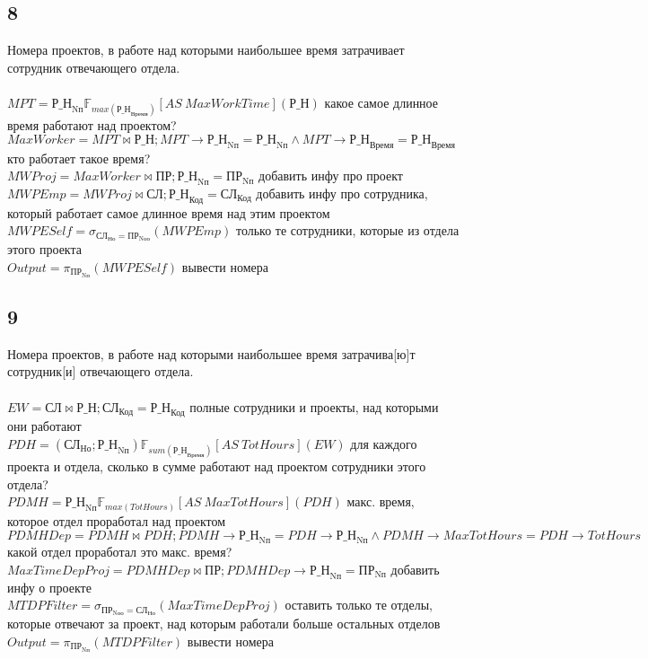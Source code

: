 \documentclass[12pt]{article}
\newcommand{\employee}{\textbf{СЛ}}
\newcommand{\project}{\textbf{ПР}}
\newcommand{\workson}{\textbf{Р\_Н}}
\newcommand{\employeeId}{\textbf{СЛ}_\text{Код}}
\newcommand{\employeeDepId}{\textbf{СЛ}_\text{Но}}
\newcommand{\projectId}{\textbf{ПР}_\text{Nп}}
\newcommand{\projectResponsibleDepId}{\textbf{ПР}_\text{Nоо}}
\newcommand{\worksonEmpId}{\textbf{Р\_Н}_\text{Код}}
\newcommand{\worksonProjId}{\textbf{Р\_Н}_\text{Nп}}
\newcommand{\worksonTime}{\textbf{Р\_Н}_\text{Время}}
\newcommand{\filter}[2]{\sigma{}_{#1} \allowbreak \left( #2 \right)}
\newcommand{\join}[3]{ #1 \bowtie #2;\allowbreak #3 }
\newcommand{\select}[2]{\pi_{#1} \allowbreak \left( #2 \right)}
\newcommand{\aggregate}[4]{  #1 \mathbb{F}_{#2} \left[AS\ #3 \right] \left( #4 \right)  }
\begin{document}
\subsection{8}
Номера проектов, в работе над которыми наибольшее время затрачивает сотрудник отвечающего отдела.\\\\
    $ MPT = \aggregate{\worksonProjId}{max(\worksonTime)}{MaxWorkTime}{\workson}$ 
 какое самое длинное время работают над проектом? \\ 
    $ MaxWorker = \join{MPT}{\workson}{MPT\rightarrow\worksonProjId = \worksonProjId \wedge  MPT\rightarrow\worksonTime = \worksonTime}$ 
 кто работает такое время? \\ 
    $ MWProj = \join{MaxWorker}{\project}{\worksonProjId = \projectId}$ 
 добавить инфу про проект \\ 
    $ MWPEmp = \join{MWProj}{\employee}{\worksonEmpId = \employeeId}$ 
 добавить инфу про сотрудника, который работает самое длинное время над этим проектом \\  
    $ MWPESelf = \filter{\employeeDepId = \projectResponsibleDepId}{MWPEmp}$ 
 только те сотрудники, которые из отдела этого проекта \\ 
    $ Output = \select{\projectId}{MWPESelf}$ 
 вывести номера \\ 

\subsection{9}
Номера проектов, в работе над которыми наибольшее время затрачива[ю]т сотрудник[и] отвечающего отдела.\\\\
    $ EW = \join{\employee}{\workson}{\employeeId = \worksonEmpId}$ 
 полные сотрудники и проекты, над которыми они работают \\ 
    $ PDH = \aggregate{\left(\employeeDepId; \worksonProjId\right)}{sum(\worksonTime)}{TotHours}{EW}$ 
 для каждого проекта и отдела, сколько в сумме работают над проектом сотрудники этого отдела? \\ 
    $ PDMH = \aggregate{\worksonProjId}{max(TotHours)}{MaxTotHours}{PDH}$ 
 макс. время, которое отдел проработал над проектом \\ 
    $ PDMHDep = \join{PDMH}{PDH}{PDMH\rightarrow\worksonProjId = PDH\rightarrow\worksonProjId \wedge PDMH\rightarrow MaxTotHours = PDH\rightarrow TotHours}$ 
 какой отдел проработал это макс. время? \\ 
    $ MaxTimeDepProj = \join{PDMHDep}{\project}{PDMHDep\rightarrow\worksonProjId = \projectId}$ 
 добавить инфу о проекте \\ 
    $ MTDPFilter = \filter{\projectResponsibleDepId = \employeeDepId}{MaxTimeDepProj}$ 
 оставить только те отделы, которые отвечают за проект, над которым работали больше остальных отделов \\ 
    $ Output = \select{\projectId}{MTDPFilter}$ 
 вывести номера \\ 
\end{document}
